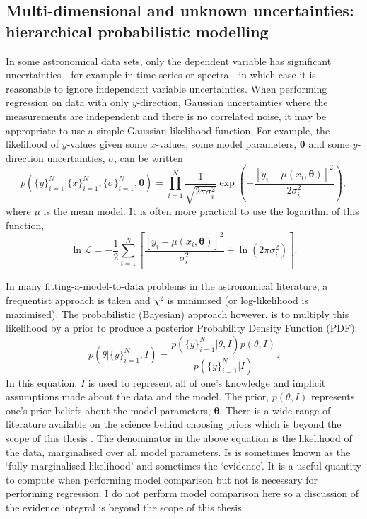 \subsection{Multi-dimensional and unknown uncertainties: hierarchical
probabilistic modelling}
In some astronomical data sets, only the dependent variable has significant
uncertainties---for example in time-series or spectra---in which case it is
reasonable to ignore independent variable uncertainties.
When performing regression on data with only $y$-direction, Gaussian
uncertainties where the measurements are independent and there is no
correlated noise, it may be appropriate to use a simple Gaussian likelihood
function.
For example, the likelihood of $y$-values given some $x$-values, some model
parameters, $\mathbf{\theta}$ and some $y$-direction uncertainties, $\sigma$,
can be written
\begin{equation}
    p(\{y\}_{i=1}^N|\{x\}_{i=1}^N, \{\sigma\}_{i=1}^N, \mathbf{\theta})
    = \prod_{i=1}^N \frac{1}{\sqrt{2\pi\sigma_i^2}}
    \exp\left(-\frac{[y_i - \mu(x_i, \mathbf{\theta})]^2}{2\sigma_i^2}\right),
\end{equation}
where $\mu$ is the mean model.
It is often more practical to use the logarithm of this function,
\begin{equation}
    \ln\mathcal{L} =
    -\frac{1}{2} \sum_{i=1}^N \left[\frac{[y_i - \mu(x_i,
    \mathbf{\theta})]^2}{\sigma_i^2} +
    \ln\left(2\pi\sigma_i^2\right) \right].
\label{eq:lnlike_intro}
\end{equation}

In many fitting-a-model-to-data problems in the astronomical literature, a
frequentist approach is taken and $\chi^2$ is minimised (or log-likelihood is
maximised).
The probabilistic (Bayesian) approach however, is to multiply this likelihood
by a prior to produce a posterior Probability Density Function (PDF):
\begin{equation}
    p(\theta|\{y\}_{i=1}^N, I) = \frac{p(\{y\}_{i=1}^N|\theta, I)
    p(\theta, I)}{p(\{y\}_{i=1}^N|I)}.
\end{equation}
In this equation, $I$ is used to represent all of one's knowledge and
implicit assumptions made about the data and the model.
The prior, $p(\theta, I)$ represents one's prior beliefs about the model
parameters, $\mathbf{\theta}$.
There is a wide range of literature available on the science behind choosing
priors which is beyond the scope of this thesis \citep[\eg][]{Kass1996,
Gelman2009, Vanderplas2014}.
The denominator in the above equation is the likelihood of the data,
marginalised over all model parameters.
Is is sometimes known as the `fully marginalised likelihood' and sometimes the
`evidence'.
It is a useful quantity to compute when performing model comparison but not
is necessary for performing regression.
I do not perform model comparison here so a discussion of the evidence
integral is beyond the scope of this thesis.

